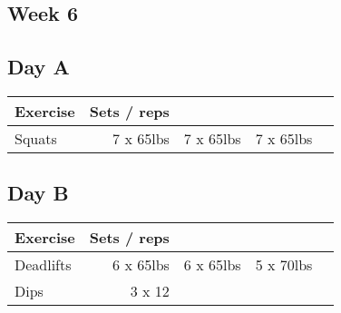 \documentclass[12pt, a4paper]{article}%
\begin{document}
 \subsection*{\hspace{0.25em} Week 6 }
  \subsection*{\hspace{0.5em} Day A }


  \begin{tabular}{l|rrrr}
  \hspace{0.75em} \textbf{Exercise} & \textbf{Sets / reps} \\ \hline

            \hspace{0.75em} Squats
            & 7 x 65lbs
            & 7 x 65lbs
            & 7 x 65lbs
            & 
            \\


  \end{tabular}

  \subsection*{\hspace{0.5em} Day B }


  \begin{tabular}{l|rrrr}
  \hspace{0.75em} \textbf{Exercise} & \textbf{Sets / reps} \\ \hline

            \hspace{0.75em} Deadlifts
            & 6 x 65lbs
            & 6 x 65lbs
            & 5 x 70lbs
            & 
            \\


   \hspace{0.75em} Dips & 3 x 12 \\
  \end{tabular}
\end{document}
